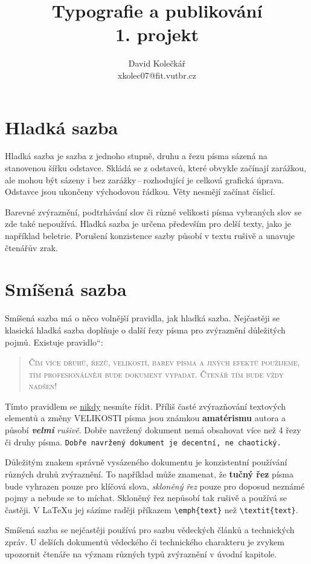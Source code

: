 \documentclass[a4paper,11pt,twocolumn]{article}
\providecommand{\uv}[1]{\quotedblbase #1\textquotedblleft}
\begin{document}
\title{Typografie a publikování\\ 1. projekt}
\author{David Kolečkář\\ xkolec07@fit.vutbr.cz}
\date{}
\maketitle

\section{Hladká sazba}
Hladká sazba je sazba z jednoho stupně, druhu a řezu písma sázená na stanovenou šířku odstavce. Skládá se z odstavců, které obvykle začínají zarážkou, ale mohou být sázeny i bez zarážky\,--\,rozhodující je celková grafická úprava. Odstavce jsou ukončeny východovou řádkou. Věty nesmějí začínat číslicí.
\par
Barevné zvýraznění, podtrhávání slov či různé velikosti písma vybraných slov se zde také nepoužívá. Hladká sazba je určena především pro delší texty, jako je například beletrie. Porušení konzistence sazby působí v textu rušivě a unavuje čtenářův zrak.

\section{Smíšená sazba}
Smíšená sazba má o něco volnější pravidla, jak hladká sazba. Nejčastěji se klasická hladká sazba doplňuje o další řezy písma pro zvýraznění důležitých pojmů. Existuje \uv{pravidlo}:

\begin{quotation}
\textsc{Čím více druhů, řezů, velikostí, barev písma a jiných efektů použijeme, tím profesionálněji bude  dokument vypadat. Čtenář tím bude vždy nadšen!}
\end{quotation}

Tímto pravidlem se \underline{nikdy} nesmíte řídit. Příliš časté zvýrazňování textových elementů a změny {\huge V}{\LARGE E}{\Large L}{\large I}{\normalsize K}{\small O}{\footnotesize S}{\scriptsize T}{\tiny I}  písma {\Large jsou} {\LARGE známkou} {\huge \textbf{amatérismu}} autora a působí \textbf{\textit{velmi}} \textit{rušivě}. Dobře navržený dokument nemá obsahovat více než 4 řezy či druhy písma. \texttt{Dobře navržený dokument je decentní, ne chaotický.}
\par
Důležitým znakem správně vysázeného dokumentu je konzistentní používání různých druhů zvýraznění. To například může znamenat, že \textbf{tučný řez} písma bude vyhrazen pouze pro klíčová slova, \textit{skloněný řez} pouze pro doposud neznámé pojmy a nebude se to míchat. Skloněný řez nepůsobí tak rušivě a používá se častěji. V {\LaTeX}u jej sázíme raději příkazem \verb|\emph{text}| než \verb|\textit{text}|.
\par
Smíšená sazba se nejčastěji používá pro sazbu vědeckých článků a technických zpráv. U delších dokumentů vědeckého či technického charakteru je zvykem upozornit čtenáře na význam různých typů zvýraznění v úvodní kapitole.
\end{document}
